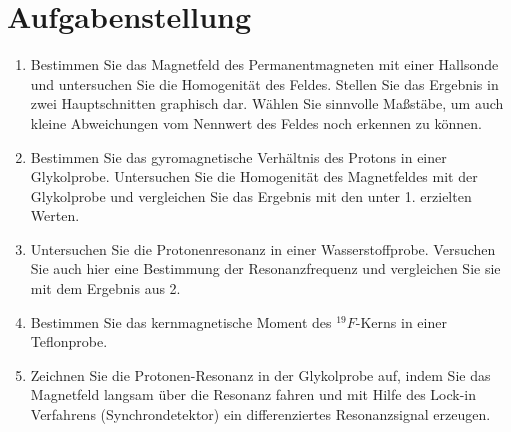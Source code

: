 \section{Aufgabenstellung}

\begin{enumerate}
\item Bestimmen Sie das Magnetfeld des Permanentmagneten mit einer Hallsonde und 
    untersuchen Sie die Homogenität des Feldes. Stellen Sie das Ergebnis in zwei 
    Hauptschnitten graphisch dar. Wählen Sie sinnvolle Maßstäbe, um auch kleine 
    Abweichungen vom Nennwert des Feldes noch erkennen zu können. 
\item Bestimmen Sie das gyromagnetische Verhältnis des Protons in einer Glykolprobe. 
    Untersuchen Sie die Homogenität des Magnetfeldes mit der Glykolprobe und 
    vergleichen Sie das Ergebnis mit den unter 1. erzielten Werten. 
\item Untersuchen Sie die Protonenresonanz in einer Wasserstoffprobe. Versuchen Sie 
    auch hier eine Bestimmung der Resonanzfrequenz und vergleichen Sie sie mit 
    dem Ergebnis aus 2. 
\item Bestimmen Sie das kernmagnetische Moment des $^{19}F$-Kerns in einer Teflonprobe. 
\item Zeichnen Sie die Protonen-Resonanz in der Glykolprobe auf, indem Sie das 
    Magnetfeld langsam über die Resonanz fahren und mit Hilfe des Lock-in 
    Verfahrens (Synchrondetektor) ein differenziertes Resonanzsignal erzeugen.
\end{enumerate}